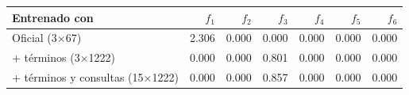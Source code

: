 \begin{tabular}{lrrrrrr}
\toprule
Entrenado con & $f_1$ & $f_2$ & $f_3$ & $f_4$ & $f_5$ & $f_6$ \\
\midrule
Oficial (3$\times$67) & 2.306 & 0.000 & 0.000 & 0.000 & 0.000 & 0.000 \\
+ términos (3$\times$1222) & 0.000 & 0.000 & 0.801 & 0.000 & 0.000 & 0.000 \\
+ términos y consultas (15$\times$1222) & 0.000 & 0.000 & 0.857 & 0.000 & 0.000 & 0.000 \\
\bottomrule
\end{tabular}
